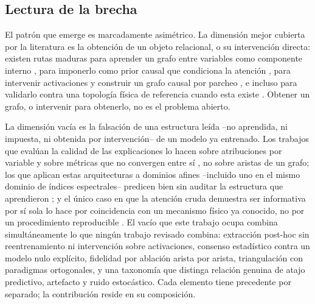 \subsection{Lectura de la brecha}

El patrón que emerge es marcadamente asimétrico. La dimensión mejor cubierta por la literatura es la obtención de un objeto relacional, o su intervención directa: existen rutas maduras para aprender un grafo entre variables como componente interno \cite{cai2024msgnet}, para imponerlo como prior causal que condiciona la atención \cite{zhao2026causalguided}, para intervenir activaciones y construir un grafo causal por parcheo \cite{mechinterp2025ts}, e incluso para validarlo contra una topología física de referencia cuando esta existe \cite{pipeline2026causalgraph}. Obtener un grafo, o intervenir para obtenerlo, no es el problema abierto.

La dimensión vacía es la falsación de una estructura leída --no aprendida, ni impuesta, ni obtenida por intervención-- de un modelo ya entrenado. Los trabajos que evalúan la calidad de las explicaciones lo hacen sobre atribuciones por variable y sobre métricas que no convergen entre sí \cite{vitexplain2024evaluation,medtext2026attribution}, no sobre aristas de un grafo; los que aplican estas arquitecturas a dominios afines --incluido uno en el mismo dominio de índices espectrales-- predicen bien sin auditar la estructura que aprendieron \cite{convlstmgcn2026vegetation,spatiotemporal2024e2e}; y el único caso en que la atención cruda demuestra ser informativa por sí sola lo hace por coincidencia con un mecanismo físico ya conocido, no por un procedimiento reproducible \cite{rotorcraft2026vortexring}. El vacío que este trabajo ocupa combina simultáneamente lo que ningún trabajo revisado combina: extracción post-hoc sin reentrenamiento ni intervención sobre activaciones, consenso estadístico contra un modelo nulo explícito, fidelidad por ablación arista por arista, triangulación con paradigmas ortogonales, y una taxonomía que distinga relación genuina de atajo predictivo, artefacto y ruido estocástico. Cada elemento tiene precedente por separado; la contribución reside en su composición.

